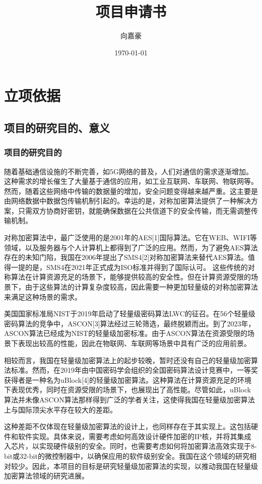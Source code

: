 \documentclass{ctexart}
\begin{document}
\title{项目申请书}
\author{向嘉豪}
\date{\today}

\maketitle


\section{立项依据}
\subsection{项目的研究目的、意义}

\subsubsection{项目的研究目的}
随着基础通信设施的不断完善，如5G网络的普及，人们对通信的需求逐渐增加。这种需求的增长催生了大量基于通信的应用，如工业互联网、车联网、物联网等。
然而，随着这些网络中传输的数据量的增加，安全问题变得越来越严重。这主要是由网络数据中数据包传输机制引起的。幸运的是，对称加密算法提供了一种解决方案，只需双方协商好密钥，就能确保数据在公共信道下的安全传输，而无需调整传输机制。

对称加密算法中，最广泛使用的是2001年的AES[1]国际算法。它在WEB、WIFI等领域，以及服务器与个人计算机上都得到了广泛的应用。然而，为了避免AES算法存在的未知门陷，我国在2006年提出了SMS4[2]对称加密算法来替代AES算法。值得一提的是，SMS4在2021年正式成为ISO标准并得到了国际认可。
这些传统的对称算法在计算资源充足的场景下，能够提供较高的安全性。但在计算资源受限的场景下，由于这些算法的计算复杂度较高，因此需要一种更加轻量级的对称加密算法来满足这种场景的需求。

美国国家标准局NIST于2019年启动了轻量级密码算法LWC的征召。在56个轻量级密码算法的竞争中，ASCON[3]算法经过三轮筛选，最终脱颖而出。到了2023年，ASCON算法已经成为NIST的轻量级加密标准。由于ASCON算法在资源受限的场景下表现出较高的性能，因此在物联网、车联网等场景中具有广泛的应用前景。

相较而言，我国在轻量级加密算法上的起步较晚，暂时还没有自己的轻量级加密算法标准。然而，在2019年由中国密码学会组织的全国密码算法设计竞赛中，一等奖获得者是一种名为uBlock[4]的轻量级加密算法。这种算法在计算资源充足的环境下表现优秀，同时在资源受限的场景下，也展现出了高性能。尽管如此，uBlock算法并未像ASCON算法那样得到广泛的学者关注，这使得我国在轻量级加密算法上与国际顶尖水平存在较大的差距。

这种差距不仅体现在轻量级加密算法的设计上，也同样存在于其实现上。这包括硬件和软件实现。具体来说，需要考虑如何高效设计硬件加密的IP核，并将其集成入芯片，以实现硬件级别的安全。同时，也需要考虑如何将加密算法高效实现于8-bit或32-bit的微控制器中，以确保应用的软件级别安全。我国在这个领域的研究相对较少。因此，本项目的目标是研究轻量级加密算法的实现，以推动我国在轻量级加密算法领域的研究进展。
\end{document}
